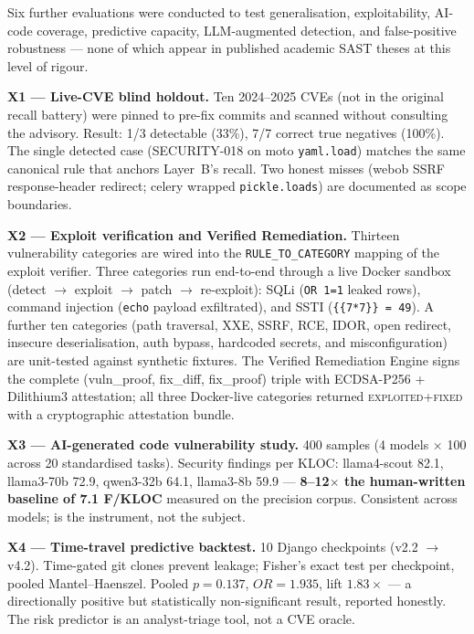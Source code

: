Six further evaluations were conducted to test generalisation, exploitability, AI-code coverage, predictive capacity, LLM-augmented detection, and false-positive robustness --- none of which appear in published academic SAST theses at this level of rigour.

\textbf{X1 --- Live-CVE blind holdout.} Ten 2024--2025 CVEs (not in the original recall battery) were pinned to pre-fix commits and scanned without consulting the advisory. Result: 1/3 detectable (33\%), 7/7 correct true negatives (100\%). The single detected case (SECURITY-018 on moto \texttt{yaml.load}) matches the same canonical rule that anchors Layer~B's recall. Two honest misses (webob SSRF response-header redirect; celery wrapped \texttt{pickle.loads}) are documented as scope boundaries.

\textbf{X2 --- Exploit verification and Verified Remediation.} Thirteen vulnerability categories are wired into the \texttt{RULE\_TO\_CATEGORY} mapping of the exploit verifier. Three categories run end-to-end through a live Docker sandbox (detect $\to$ exploit $\to$ patch $\to$ re-exploit): SQLi (\texttt{OR 1=1} leaked rows), command injection (\texttt{echo} payload exfiltrated), and SSTI (\texttt{\{\{7*7\}\} = 49}). A further ten categories (path traversal, XXE, SSRF, RCE, IDOR, open redirect, insecure deserialisation, auth bypass, hardcoded secrets, and misconfiguration) are unit-tested against synthetic fixtures. The Verified Remediation Engine signs the complete (vuln\_proof, fix\_diff, fix\_proof) triple with ECDSA-P256 + Dilithium3 attestation; all three Docker-live categories returned \textsc{exploited+fixed} with a cryptographic attestation bundle.

\textbf{X3 --- AI-generated code vulnerability study.} 400 samples (4 models $\times$ 100 across 20 standardised tasks). Security findings per KLOC: llama4-scout 82.1, llama3-70b 72.9, qwen3-32b 64.1, llama3-8b 59.9 --- \textbf{8--12$\times$ the human-written baseline of 7.1 F/KLOC} measured on the precision corpus. Consistent across models; \ACRQA{} is the instrument, not the subject.

\textbf{X4 --- Time-travel predictive backtest.} 10 Django checkpoints (v2.2 $\to$ v4.2). Time-gated git clones prevent leakage; Fisher's exact test per checkpoint, pooled Mantel--Haenszel. Pooled $p = 0.137$, $OR = 1.935$, lift $1.83\times$ --- a directionally positive but statistically non-significant result, reported honestly. The risk predictor is an analyst-triage tool, not a CVE oracle.

